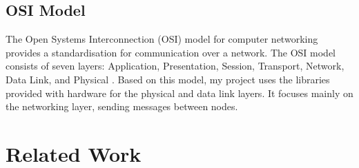 \documentclass[12pt,a4paper]{report}
\begin{document}
\subsection{OSI Model}
The Open Systems Interconnection (OSI) model for computer networking provides a standardisation for communication over a network. The OSI model consists of seven layers: Application, Presentation, Session, Transport, Network, Data Link, and Physical \cite{ib}. Based on this model, my project uses the libraries provided with hardware for the physical and data link layers. It focuses mainly on the networking layer, sending messages between nodes. \\

\section{Related Work}
\end{document}
